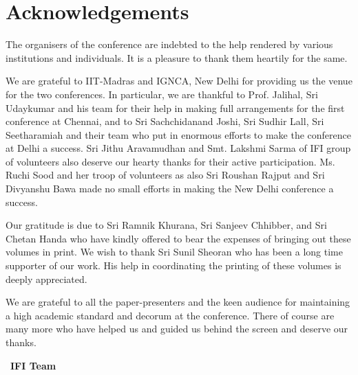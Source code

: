 \makeatletter
\def\@makeschapterhead#1{%
  \vspace*{50\p@}%
  {\parindent \z@ \raggedright
    \normalfont
    \interlinepenalty\@M
    \LARGE \bfseries  #1\par\nobreak
    \vskip 40\p@
  }}
\makeatother

\chapter*{Acknowledgements}\label{ack}



The organisers of the conference are indebted to the help rendered by various 
institutions and individuals. It is a pleasure to thank them heartily for the same.

We are grateful to IIT-Madras and IGNCA, New Delhi for providing us the venue for the two conferences.
In particular, we are thankful to Prof. Jalihal, Sri Udaykumar and his team for their help in making 
full arrangements for the first conference at Chennai, and to Sri Sachchidanand Joshi, Sri Sudhir Lall, 
Sri Seetharamiah and their team who put in enormous efforts to make the conference at Delhi a success. 
Sri Jithu Aravamudhan and Smt. Lakshmi Sarma of IFI group of volunteers also deserve our hearty thanks 
for their active participation. Ms. Ruchi Sood and her troop of volunteers as also Sri Roushan Rajput 
and Sri Divyanshu Bawa made no small efforts in making the New Delhi conference a success.

Our gratitude is due to Sri Ramnik Khurana, Sri Sanjeev Chhibber, and 
Sri Chetan Handa who have kindly offered to bear the expenses of bringing out these volumes in print.
We wish to thank Sri Sunil Sheoran who has been a long time supporter of our work. His help in coordinating the
printing of these volumes is deeply appreciated.

We are grateful to all the paper-presenters and the keen audience for maintaining a high academic standard 
and decorum at the conference. There of course are many more who have helped us and guided us behind the 
screen and deserve our thanks.
\bigskip

~\hfill {\bf IFI Team}
